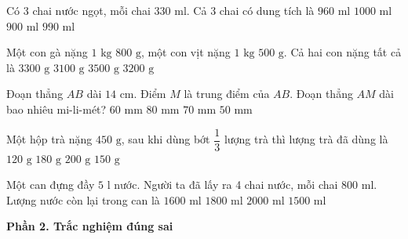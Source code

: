 \begin{ex} %
Có 3 chai nước ngọt, mỗi chai $330\text{ ml}$. Cả 3 chai có dung tích là
\choice
{$960\text{ ml}$}
{$1000\text{ ml}$}
{$900\text{ ml}$}
{\True $990\text{ ml}$}
\end{ex}

\begin{ex} %
Một con gà nặng $1\text{ kg } 800\text{ g}$, một con vịt nặng $1\text{ kg } 500\text{ g}$. Cả hai con nặng tất cả là
\choice
{\True $3300\text{ g}$}
{$3100\text{ g}$}
{$3500\text{ g}$}
{$3200\text{ g}$}
\end{ex}

\begin{ex} %
Đoạn thẳng $AB$ dài $14\text{ cm}$. Điểm $M$ là trung điểm của $AB$. Đoạn thẳng $AM$ dài bao nhiêu mi-li-mét?
\choice
{$60\text{ mm}$}
{$80\text{ mm}$}
{\True $70\text{ mm}$}
{$50\text{ mm}$}
\end{ex}

\begin{ex} %
Một hộp trà nặng $450\text{ g}$, sau khi dùng bớt $\dfrac{1}{3}$ lượng trà thì lượng trà đã dùng là
\choice
{$120\text{ g}$}
{$180\text{ g}$}
{$200\text{ g}$}
{\True $150\text{ g}$}
\end{ex}

\begin{ex} %
Một can đựng đầy $5\text{ l}$ nước. Người ta đã lấy ra 4 chai nước, mỗi chai $800\text{ ml}$. Lượng nước còn lại trong can là
\choice
{$1600\text{ ml}$}
{\True $1800\text{ ml}$}
{$2000\text{ ml}$}
{$1500\text{ ml}$}
\end{ex}

\textbf{Phần 2. Trắc nghiệm đúng sai}

